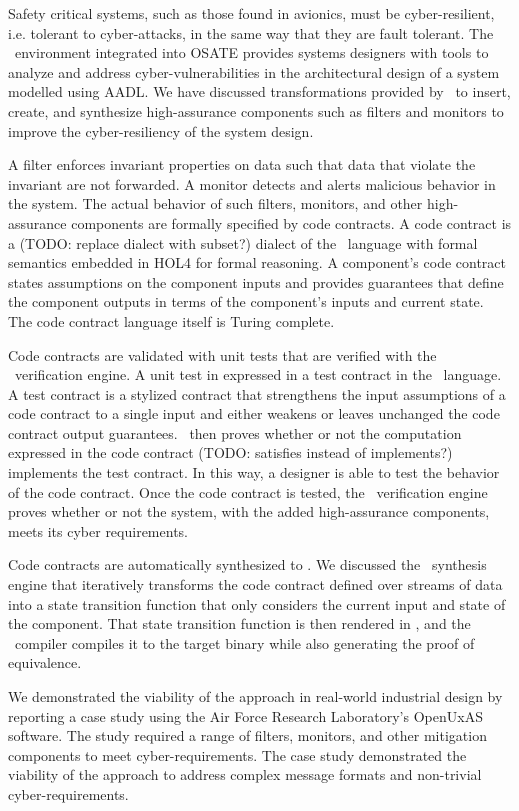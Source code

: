 Safety critical systems, such as those found in avionics, must be cyber-resilient, i.e. tolerant to cyber-attacks, in the same way that they are fault tolerant. 
The \brfcs\ environment integrated into OSATE provides systems designers with tools to analyze and address cyber-vulnerabilities in the architectural design of a system modelled using AADL.
We have discussed transformations provided by \brfcs\ to insert, create, and synthesize high-assurance components such as filters and monitors to improve the cyber-resiliency of the system design.

A filter enforces invariant properties on data such that data that violate the invariant are not forwarded.
A monitor detects and alerts malicious behavior in the system. 
The actual behavior of such filters, monitors, and other high-assurance components are formally specified by code contracts.
A code contract is a (TODO: replace dialect with subset?) dialect of the \agr\ language with formal semantics embedded in HOL4 for formal reasoning.
A component's code contract states assumptions on the component inputs and provides guarantees that define the component outputs in terms of the component's inputs and current state.
The code contract language itself is Turing complete.

Code contracts are validated with unit tests that are verified with the \agr\ verification engine.
A unit test in expressed in a test contract in the \agr\ language.
A test contract is a stylized contract that strengthens the input assumptions of a code contract to a single input and either weakens or leaves unchanged the code contract output guarantees.
\agr\ then proves whether or not the computation expressed in the code contract (TODO: satisfies instead of implements?) implements the test contract.
In this way, a designer is able to test the behavior of the code contract.
Once the code contract is tested, the \agr\ verification engine proves whether or not the system, with the added high-assurance components, meets its cyber requirements.

Code contracts are automatically synthesized to \ckml.
We discussed the \splt\ synthesis engine that iteratively transforms the code contract defined over streams of data into a state transition function that only considers the current input and state of the component.
That state transition function is then rendered in \ckml, and the \ckml\ compiler compiles it to the target binary while also generating the proof of equivalence.

We demonstrated the viability of the approach in real-world industrial design by reporting a case study using the Air Force Research Laboratory's OpenUxAS software.
The study required a range of filters, monitors, and other mitigation components to meet cyber-requirements.
The case study demonstrated the viability of the approach to address complex message formats and non-trivial cyber-requirements.


